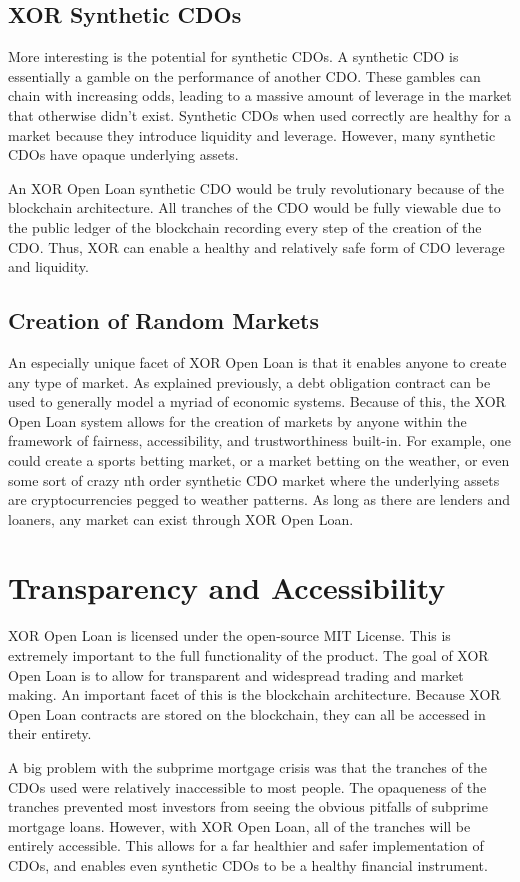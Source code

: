 \documentclass[twoside]{article}
\begin{document}
\subsection{XOR Synthetic CDOs}
More interesting is the potential for synthetic CDOs. A synthetic CDO is essentially a gamble on the performance of another CDO. These gambles can chain with increasing odds, leading to a massive amount of leverage in the market that otherwise didn't exist. Synthetic CDOs when used correctly are healthy for a market because they introduce liquidity and leverage. However, many synthetic CDOs have opaque underlying assets. 

An XOR Open Loan synthetic CDO would be truly revolutionary because of the blockchain architecture. All tranches of the CDO would be fully viewable due to the public ledger of the blockchain recording every step of the creation of the CDO. Thus, XOR can enable a healthy and relatively safe form of CDO leverage and liquidity. 
\subsection{Creation of Random Markets}
An especially unique facet of XOR Open Loan is that it enables anyone to create any type of market. As explained previously, a debt obligation contract can be used to generally model a myriad of economic systems. Because of this, the XOR Open Loan system allows for the creation of markets by anyone within the framework of fairness, accessibility, and trustworthiness built-in. For example, one could create a sports betting market, or a market betting on the weather, or even some sort of crazy nth order synthetic CDO market where the underlying assets are cryptocurrencies pegged to weather patterns. As long as there are lenders and loaners, any market can exist through XOR Open Loan. 

\section{Transparency and Accessibility}
XOR Open Loan is licensed under the open-source MIT License. This is extremely important to the full functionality of the product. The goal of XOR Open Loan is to allow for transparent and widespread trading and market making. An important facet of this is the blockchain architecture. Because XOR Open Loan contracts are stored on the blockchain, they can all be accessed in their entirety. 

A big problem with the subprime mortgage crisis was that the tranches of the CDOs used were relatively inaccessible to most people. The opaqueness of the tranches prevented most investors from seeing the obvious pitfalls of subprime mortgage loans. However, with XOR Open Loan, all of the tranches will be entirely accessible. This allows for a far healthier and safer implementation of CDOs, and enables even synthetic CDOs to be a healthy financial instrument. 
\end{document}
